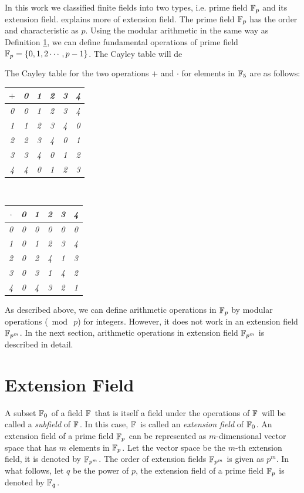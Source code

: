 In this work we classified finite fields into two types, i.e.  prime field ${\mathbb{F}}_{p}$ and its extension field. 
  explains more of extension field.
The prime field ${\mathbb{F}}_{p}$ has  the order and characteristic as $p$.
Using the modular arithmetic in the same way as Definition \ref{sec:chap:fund:extenion_field}, we can define fundamental operations of prime field ${\mathbb{F}}_{p}=\{0,1,2\cdots,p-1\}$.
The Cayley table will de
\begin{example}The Cayley table for the two operations $+$ and $\cdot$ for elements in ${\mathbb{F}}_{5}$ are as follows:
	\begin{center}
		\begin{tabular}{c|ccccc}
			$+$&\em 0&\em 1&\em 2&\em 3&\em 4       \\
			\hline
			\em 0&\em 0&\em 1&\em 2&\em 3&\em 4       \\
			\em 1&\em 1&\em 2&\em 3&\em 4&\em 0      \\
			\em 2&\em 2&\em 3&\em 4&\em 0&\em 1      \\
			\em 3&\em 3&\em 4&\em 0&\em 1&\em 2      \\
			\em 4&\em 4&\em 0&\em 1&\em 2&\em 3      \\
		\end{tabular}\ \ 
		\begin{tabular}{c|ccccc}
			$\cdot$&\em 0&\em 1&\em 2&\em 3&\em 4       \\
			\hline
			\em 0&\em 0&\em 0&\em 0&\em 0&\em 0       \\
			\em 1&\em 0&\em 1&\em 2&\em 3&\em 4      \\
			\em 2&\em 0&\em 2&\em 4&\em 1&\em 3      \\
			\em 3&\em 0&\em 3&\em 1&\em 4&\em 2      \\
			\em 4&\em 0&\em 4&\em 3&\em 2&\em 1      \\
		\end{tabular}
	\end{center}
\end{example}
As described above, we can define arithmetic operations in ${\mathbb{F}}_{p}$ by modular operations ($\bmod\ p$) for integers. However, it does not work in an extension field ${\mathbb{F}}_{p^{m}}$. In the next section, arithmetic operations in extension field ${\mathbb{F}}_{p^{m}}$ is described in detail.


\section{Extension Field} 
\label{sec:chap:fund:extenion_field}
A subset ${\mathbb{F}}_{0^{}}$ of a field ${\mathbb{F}}_{^{}}$ that is itself a field under the operations of ${\mathbb{F}}_{^{}}$ will be called a {\it subfield} of ${\mathbb{F}}_{^{}}$.
In this case, ${\mathbb{F}}_{^{}}$ is called an {\it extension field} of ${\mathbb{F}}_{0^{}}$.
An extension field of a prime field ${\mathbb{F}}_{p^{}}$ can be represented as $m$-dimensional vector space that has $m$ elements in ${\mathbb{F}}_{p^{}}$.
Let the vector space be the $m$-th extension field, it is denoted by ${\mathbb{F}}_{p^{m}}$.
The order of extension fields ${\mathbb{F}}_{p^{m}}$ is given as $p^m$. 
In what follows, let $q$ be the power of $p$, the extension field of a prime field ${\mathbb{F}}_{p^{}}$ is denoted by ${\mathbb{F}}_{q^{}}$.



